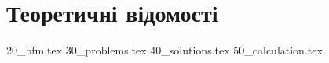 \chapter{Теоретичні відомості}
{20_bfm.tex}
{30_problems.tex}
{40_solutions.tex}
{50_calculation.tex}
